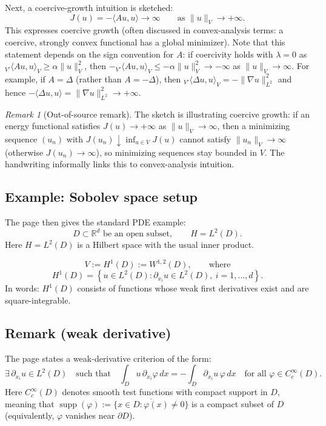 \documentclass[11pt]{article}
\theoremstyle{definition}
\theoremstyle{remark}
\newtheorem{remark}{Remark}
\begin{document}
Next, a coercive-growth intuition is sketched:
\[
J(u)=-\langle Au,u\rangle \longrightarrow \infty
\qquad \text{as }\|u\|_V\to +\infty.
\]
This expresses coercive growth (often discussed in convex-analysis terms: a coercive, strongly convex functional has a global minimizer). Note that this statement depends on the sign convention for $A$: if coercivity holds with $\lambda=0$ as ${}_{V'}\langle Au,u\rangle_V \ge \alpha \|u\|_V^2$, then $-{}_{V'}\langle Au,u\rangle_V \le -\alpha\|u\|_V^2\to -\infty$ as $\|u\|_V\to\infty$. For example, if $A=\Delta$ (rather than $A=-\Delta$), then ${}_{V'}\langle \Delta u,u\rangle_V=-\|\nabla u\|_{L^2}^2$ and hence $-\langle \Delta u,u\rangle=\|\nabla u\|_{L^2}^2\to+\infty$.

\begin{remark}[Out-of-source remark]
The sketch is illustrating coercive growth: if an energy functional satisfies $J(u)\to +\infty$ as $\|u\|_V\to\infty$, then a minimizing sequence $(u_n)$ with $J(u_n)\downarrow \inf_{u\in V}J(u)$ cannot satisfy $\|u_n\|_V\to\infty$ (otherwise $J(u_n)\to\infty$), so minimizing sequences stay bounded in $V$. The handwriting informally links this to convex-analysis intuition.
\end{remark}

\subsection*{Example: Sobolev space setup}

The page then gives the standard PDE example:
\[
D \subset \mathbb{R}^d \text{ be an open subset},
\qquad
H=L^2(D).
\]
Here $H=L^2(D)$ is a Hilbert space with the usual inner product.

\[
V := H^1(D) := W^{1,2}(D),
\qquad \text{where}
\]
\[
H^1(D)
=
\left\{
u\in L^2(D)
:
\partial_{x_i}u \in L^2(D),\ i=1,\ldots,d
\right\}.
\]
In words: $H^1(D)$ consists of functions whose weak first derivatives exist and are square-integrable.

\subsection*{Remark (weak derivative)}

The page states a weak-derivative criterion of the form:
\[
\exists\,\partial_{x_i}u \in L^2(D)
\quad\text{such that}\quad
\int_D u\,\partial_{x_i}\varphi\,dx
=
-\int_D \partial_{x_i}u\,\varphi\,dx
\quad \text{for all } \varphi \in C_c^\infty(D).
\]
Here $C_c^\infty(D)$ denotes smooth test functions with compact support in $D$, meaning that $\operatorname{supp}(\varphi):=\overline{\{x\in D:\varphi(x)\neq 0\}}$ is a compact subset of $D$ (equivalently, $\varphi$ vanishes near $\partial D$).
\end{document}
